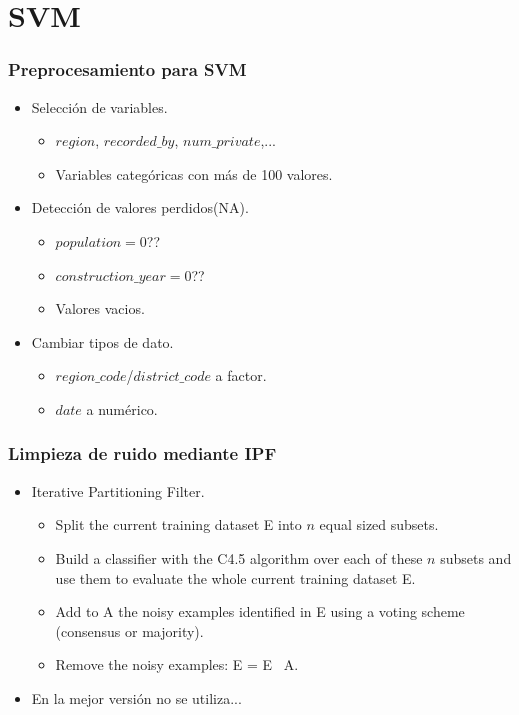 \section{SVM}

\begin{frame}
\frametitle{Preprocesamiento para SVM}

\begin{itemize}
	\item Selección de variables. 
	\begin{itemize}
		\item $region$, $recorded\_by$, $num\_private$,...
		\item Variables categóricas con más de 100 valores.
	\end{itemize}
	\pause
	\item Detección de valores perdidos(NA).
	\begin{itemize}
		\item $population = 0$??
		\item $construction\_year = 0$??
		\item Valores vacios.
	\end{itemize}
	\pause
	\item Cambiar tipos de dato.
	\begin{itemize}
		\item $region\_code$/$district\_code$ a factor.
		\item $date$ a numérico.
	\end{itemize}
\end{itemize}



\end{frame}

\begin{frame}

\frametitle{Limpieza de ruido mediante IPF}

\begin{itemize}
	\item Iterative Partitioning Filter.
	{
	\begin{itemize}
		\item Split the current training dataset E into $n$ equal sized subsets.
		\item  Build a classifier with the C4.5 algorithm over each of these $n$ subsets and use them to evaluate the whole current training dataset E.
		\item Add to A the noisy examples identified in E using a voting scheme (consensus or majority).
		\item Remove the noisy examples: E = E \ A.
	\end{itemize}
	}

	\item En la mejor versión no se utiliza...
\end{itemize}

\end{frame}

